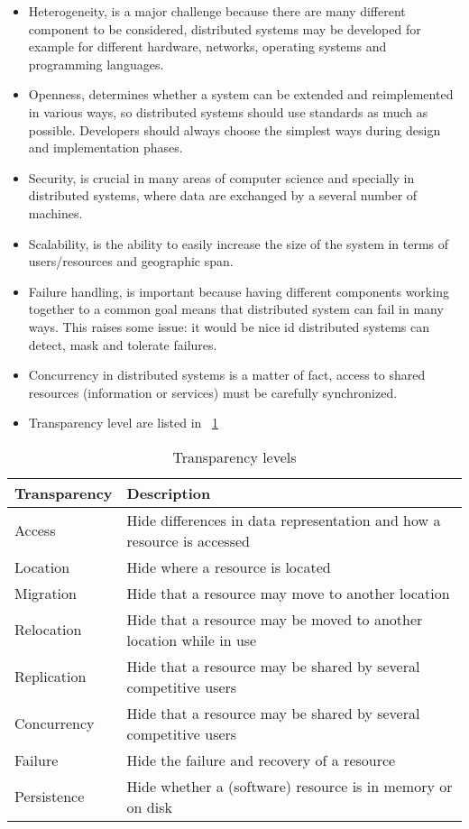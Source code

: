 \begin{itemize}
	\item Heterogeneity, is a major challenge because there are many different component to be considered, distributed systems may be developed for example for different hardware, networks, operating systems and programming languages.
	\item Openness, determines whether a system can be extended and reimplemented in various ways, so distributed systems should use standards as much as possible. Developers should always choose the simplest ways during design and implementation phases.
	\item Security, is crucial in many areas of computer science and specially in distributed systems, where data are exchanged by a several number of machines.
	\item Scalability, is the ability to easily increase the size of the system in terms of users/resources and geographic
	span.
	\item Failure handling, is important because having different components working together to a common goal means that distributed system can fail in many ways. This raises some issue: it would be nice id distributed systems can detect, mask and tolerate failures.
	\item Concurrency in distributed systems is a matter of
	fact, access to shared resources (information or services)
	must be carefully synchronized.
	\item Transparency level are listed in \tablename~\ref{tab:transparency}
\end{itemize}

	\begin{table}[h]
		\caption{Transparency levels}
		\label{tab:transparency}
		\centering
		\begin{tabular}{lp{}}
			\toprule
			\textbf{Transparency} & \textbf{Description}\\
			\midrule
			Access & Hide differences in data representation and how a resource is accessed\\
			Location & Hide where a resource is located\\
			Migration & Hide that a resource may move to another location\\
			Relocation & Hide that a resource may be moved to another location while in use\\
			Replication & Hide that a resource may be shared by several competitive users\\
			Concurrency & Hide that a resource may be shared by several competitive users\\
			Failure & Hide the failure and recovery of a resource\\
			Persistence & Hide whether a (software) resource is in memory or on disk\\
			\bottomrule
		\end{tabular}
	\end{table}

